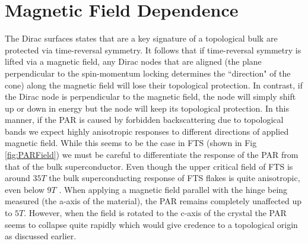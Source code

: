\section{Magnetic Field Dependence}
The Dirac surfaces states that are a key signature of a topological bulk are protected via time-reversal symmetry. It follows that if time-reversal symmetry is lifted via a magnetic field, any Dirac nodes that are aligned (the plane perpendicular to the spin-momentum locking determines the ``direction" of the cone) along the magnetic field will lose their topological protection. In contrast, if the Dirac node is perpendicular to the magnetic field, the node will simply shift up or down in energy but the node will keep its topological protection. In this manner, if the \ac{PAR} is caused by forbidden backscattering due to topological bands we expect highly anisotropic responses to different directions of applied magnetic field. While this seems to be the case in \ac{FTS} (shown in Fig \ref{fig:PARField}) we must be careful to differentiate the response of the \ac{PAR} from that of the bulk superconductor. Even though the upper critical field of \ac{FTS} is around $35 T$\cite{Mele2012} the bulk superconducting response of \ac{FTS} flakes is quite anisotropic, even below $9 T$ \cite{zalic2019}. When applying a magnetic field parallel with the hinge being measured (the a-axis of the material), the \ac{PAR} remains completely unaffected up to $5 T$. However, when the field is rotated to the c-axis of the crystal the \ac{PAR} seems to collapse quite rapidly which would give credence to a topological origin as discussed earlier. 
